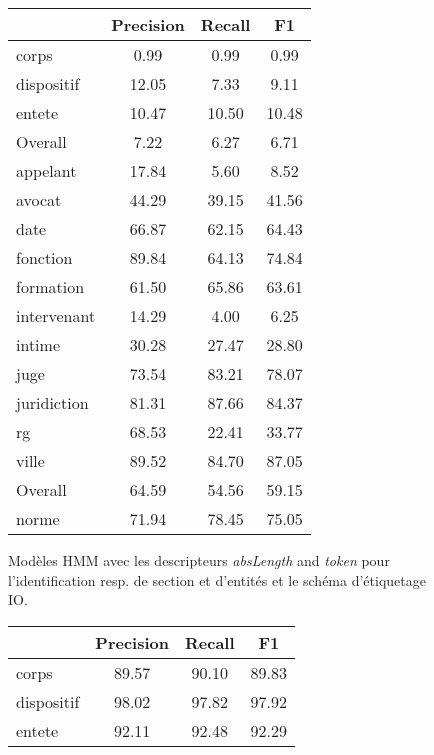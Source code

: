 \begin{table}[!h]
\centering
\scriptsize
\begin{subfigure}[t]{0.45\textwidth}
\centering
\begin{tabular}{|l|ccc|}
\hline
        & Precision &  Recall  & F1 \\\hline
corps   &    0.99 &   0.99 &   0.99 \\
dispositif &   12.05 &   7.33 &   9.11 \\
entete  &   10.47 &  10.50 &  10.48 \\\hline
Overall &    7.22 &   6.27 &   6.71 \\\hline
 \noalign{\smallskip}\hline\noalign{\smallskip}
appelant &   17.84 &   5.60 &   8.52 \\
avocat  &   44.29 &  39.15 &  41.56 \\
date    &   66.87 &  62.15 &  64.43 \\
fonction &   89.84 &  64.13 &  74.84 \\
formation &   61.50 &  65.86 &  63.61 \\
intervenant &   14.29 &   4.00 &   6.25 \\
intime  &   30.28 &  27.47 &  28.80 \\
juge    &   73.54 &  83.21 &  78.07 \\
juridiction &   81.31 &  87.66 &  84.37 \\
rg      &   68.53 &  22.41 &  33.77 \\
ville   &   89.52 &  84.70 &  87.05 \\\hline
Overall &   64.59 &  54.56 &  59.15 \\\hline
 \noalign{\smallskip}\hline\noalign{\smallskip}
norme   &   71.94 &  78.45 &  75.05 \\\hline
\end{tabular}
\caption{Modèles HMM avec les descripteurs \textit{absLength} and \textit{token} pour l'identification resp. de section et d'entités et le schéma d'étiquetage IO.} \label{tab:structuration:perf-detail-entity-hmm}
\end{subfigure} 
\hfill
\begin{subfigure}[t]{0.45\textwidth}
\centering
\begin{tabular}{|l|ccc|}
\hline
         & Precision &  Recall  & F1 \\\hline
corps   &   89.57 &  90.10 &  89.83 \\
dispositif &   98.02 &  97.82 &  97.92 \\
entete  &   92.11 &  92.48 &  92.29 \\\hline

\end{tabular}
\end{subfigure}
\end{table}
